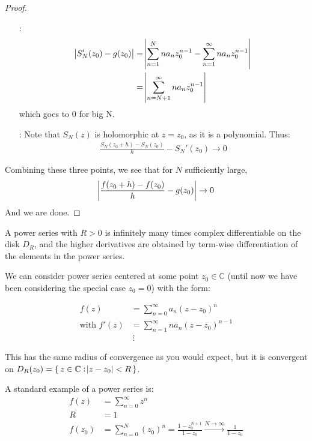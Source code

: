 \begin{proof}
\begin{itemize}
    

    \item[\circled{2} :]
    \begin{align*}
        \abs{S_N'(z_0)-g(z_0)} &=\abs{\sum_{n=1}^N na_n z_0^{n-1} -\sum_{n=1}^\infty na_n z_0^{n-1}}\\
        &= \abs{\sum_{n=N+1}^\infty na_n z_0^{n-1}}
    \end{align*}
    which goes to 0 for big N.
    
    
    \item[\circled{1} :] Note that $S_N(z)$ is holomorphic at $z=z_0$, as it is a polynomial. Thus:
    \begin{align*}
        \frac{S_N(z_0+h)-S_N(z_0)}{h} - S_N'(z_0) \rightarrow 0
    \end{align*}
    
\end{itemize}

Combining these three points, we see that for $N$ sufficiently large,
\begin{align*}
    \abs{\frac{f(z_0+h)-f(z_0)}{h} - g(z_0)} \rightarrow 0
\end{align*}
And we are done.
\end{proof}



\begin{corollary}
A power series with $R>0$ is infinitely many times complex differentiable on the disk $D_R$, and the higher derivatives are obtained by term-wise differentiation of the elements in the power series.
\end{corollary}

\begin{remark}
We can consider power series centered at some point $z_0\in\mathbb{C}$ (until now we have been considering the special case $z_0 = 0$) with the form:

\begin{align*}
    f(z)&=\sum_{n=0}^\infty a_n(z-z_0)^n\\
    \text{with } f'(z)&=\sum_{n=1}^\infty na_n(z-z_0)^{n-1}\\
    & \ \vdots
\end{align*}

This has the same radius of convergence as you would expect, but it is convergent on $D_R(z_0)=\set{z\in \mathbb{C} : \abs{z-z_0}<R }$.
\end{remark}

\begin{example} A standard example of a power series is:
\begin{align*}
    f(z)&=\sum_{n=0}^\infty z^n\\
    R&= 1 \\
    f(z_0)&=\sum_{n=0}^N (z_0)^n = \frac{1-z_0^{N+1}}{1-z_0} \xrightarrow{N\rightarrow\infty} \frac{1}{1-z_0}
    \end{align*}
\end{example}

